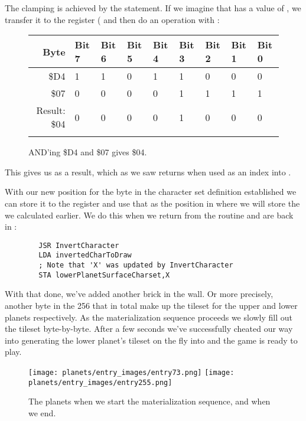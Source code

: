 The clamping is achieved by the  statement. If we imagine that  has a value of
, we transfer it to the  register ( and then do an  operation
with :

\begin{figure}[H]
  {
    \setlength{\tabcolsep}{3.0pt}
    \setlength\cmidrulewidth{\heavyrulewidth} %
    \begin{adjustbox}{width=10cm,center}

      \begin{tabular}{rllllllll}
        \toprule
        Byte & Bit 7 & Bit 6 & Bit 5 & Bit 4 & Bit 3 & Bit 2 & Bit 1 & Bit 0        \\
        \midrule
        \$D4 & 1 & 1 & 0 & 1 & 1 & 0 & 0 & 0 \\
        \$07 & 0 & 0 & 0 & 0 & 1 & 1 & 1 & 1 \\
        \midrule
        Result: \$04 & 0 & 0 & 0 & 0 & 1 & 0 & 0 & 0 \\
        \addlinespace
        \bottomrule
      \end{tabular}

    \end{adjustbox}

  }\caption*{AND'ing \$D4 and \$07 gives \$04.}
\end{figure}

This gives us  as a result, which as we saw returns  when used as an index
into .

With our new position for the byte in the character set definition established we can store it to the
 register and use that as the position in  where we will
store the  we calculated earlier. We do this when we return from the
 routine and are back in :

\begin{lstlisting}
        JSR InvertCharacter
        LDA invertedCharToDraw
        ; Note that 'X' was updated by InvertCharacter
        STA lowerPlanetSurfaceCharset,X
\end{lstlisting}

With that done, we've added another brick in the wall. Or more precisely, another byte in the 
256 that in total make up the tileset for the upper and lower planets respectively. As the 
materialization sequence proceeds we slowly fill out the tileset byte-by-byte. After a few
seconds we've successfully cheated our way into generating the lower planet's tileset on the
fly into  and the game is ready to play.

\begin{figure}[H]
    \centering
      \texttt{[image: planets/entry\_images/entry73.png]}%
      \texttt{[image: planets/entry\_images/entry255.png]}%
\caption{The planets when we start the materialization sequence, and when we end.}
\end{figure}
